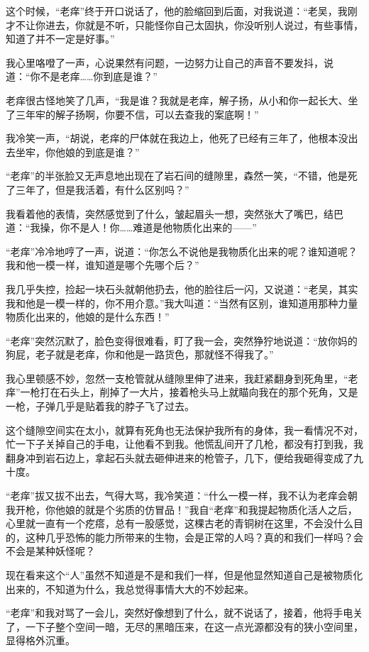 这个时候，“老痒”终于开口说话了，他的脸缩回到后面，对我说道：“老吴，我刚才不让你进去，你就是不听，只能怪你自己太固执，你没听别人说过，有些事情，知道了并不一定是好事。”

我心里咯噔了一声，心说果然有问题，一边努力让自己的声音不要发抖，说道：“你不是老痒……你到底是谁？”

老痒很古怪地笑了几声，“我是谁？我就是老痒，解子扬，从小和你一起长大、坐了三年牢的解子扬啊，你要不信，可以去查我的案底啊！”

我冷笑一声，“胡说，老痒的尸体就在我边上，他死了已经有三年了，他根本没出去坐牢，你他娘的到底是谁？”

“老痒”的半张脸又无声息地出现在了岩石间的缝隙里，森然一笑，“不错，他是死了三年了，但是我活着，有什么区别吗？”

我看着他的表情，突然感觉到了什么，皱起眉头一想，突然张大了嘴巴，结巴道：“我操，你不是人！你……难道是他物质化出来的——”

“老痒”冷冷地哼了一声，说道：“你怎么不说他是我物质化出来的呢？谁知道呢？我和他一模一样，谁知道是哪个先哪个后？”

我几乎失控，捡起一块石头就朝他扔去，他的脸往后一闪，又说道：“老吴，其实我和他是一模一样的，你不用介意。”我大叫道：“当然有区别，谁知道用那种力量物质化出来的，他娘的是什么东西！”

“老痒”突然沉默了，脸色变得很难看，盯了我一会，突然狰狞地说道：“放你妈的狗屁，老子就是老痒，你和他是一路货色，那就怪不得我了。”

我心里顿感不妙，忽然一支枪管就从缝隙里伸了进来，我赶紧翻身到死角里，“老痒”一枪打在石头上，削掉了一大片，接着枪头马上就瞄向我在的那个死角，又是一枪，子弹几乎是贴着我的脖子飞了过去。

这个缝隙空间实在太小，就算有死角也无法保护我所有的身体，我一看情况不对，忙一下子关掉自己的手电，让他看不到我。他慌乱间开了几枪，都没有打到我，我翻身冲到岩石边上，拿起石头就去砸伸进来的枪管子，几下，便给我砸得变成了九十度。

“老痒”拔又拔不出去，气得大骂，我冷笑道：“什么一模一样，我不认为老痒会朝我开枪，你他娘的就是个劣质的仿冒品！”我自“老痒”和我提起物质化活人之后，心里就一直有一个疙瘩，总有一股感觉，这棵古老的青铜树在这里，不会没什么目的，这种几乎恐怖的能力所带来的生物，会是正常的人吗？真的和我们一样吗？会不会是某种妖怪呢？

现在看来这个“人”虽然不知道是不是和我们一样，但是他显然知道自己是被物质化出来的，不知道为什么，我总觉得事情大大的不妙起来。

“老痒”和我对骂了一会儿，突然好像想到了什么，就不说话了，接着，他将手电关了，一下子整个空间一暗，无尽的黑暗压来，在这一点光源都没有的狭小空间里，显得格外沉重。

